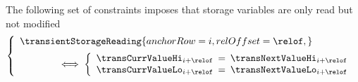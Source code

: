 The following set of constraints imposes that storage variables are only read but not modified
\[
	\left\{ \begin{array}{l}
		\transientStorageReading {
			anchorRow = i      ,
			relOffset = \relof ,
		}
		\vspace{2mm} \\
		\qquad\qquad
		\iff
		\left\{ \begin{array}{lcl}
			\transCurrValueHi _{i + \relof} & \!\!\! = \!\!\! & \transNextValueHi _{i + \relof} \\
			\transCurrValueLo _{i + \relof} & \!\!\! = \!\!\! & \transNextValueLo _{i + \relof} \\ 
		\end{array} \right.
	\end{array} \right.
\]
